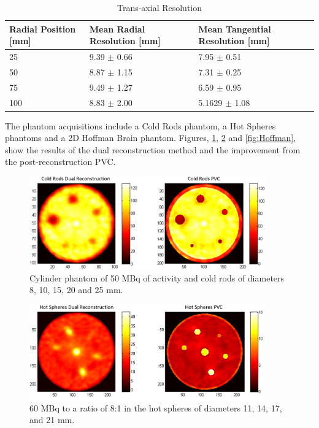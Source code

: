 \begin{table}[!b]
\renewcommand{\arraystretch}{1.3}

\captionsetup{font=small}
\caption{Trans-axial Resolution}
\label{table_reso}
\centering

\begin{tabular}{|p{2.9cm}|p{4.6cm}|p{4.8cm}|}
\hline
Radial Position [mm]& Mean Radial Resolution [mm]& Mean Tangential Resolution [mm] \\
\hline
 25 & 9.39 $\pm$ 0.66 & 7.95 $\pm$ 0.51\\
\hline
 50 & 8.87 $\pm$ 1.15 & 7.31 $\pm$ 0.25\\
\hline
 75 & 9.49 $\pm$ 1.27 & 6.59 $\pm$ 0.95\\
\hline
 100 & 8.83 $\pm$ 2.00 & 5.1629 $\pm$ 1.08\\
\hline
\end{tabular}
\end{table}

 The phantom acquisitions include a Cold Rods phantom, a Hot Spheres phantoms and a 2D Hoffman Brain phantom. Figures, \ref{fig:cold}, \ref{fig:Hot} and \ref{fig:Hoffman}, show the results of the dual reconstruction method and the improvement from the post-reconstruction PVC.

\begin{figure}[!t]
\centering
\includegraphics[width=4in]{figures/ColdRods.png}

\caption{Cylinder phantom of 50 MBq of activity and cold rods of diameters 8, 10, 15, 20 and 25 mm.}
\label{fig:cold}
\end{figure}

\begin{figure}[!t]
\centering
\includegraphics[width=4in]{figures/HotSpheres.png}

\caption{60 MBq to a ratio of 8:1 in the hot spheres of diameters 11, 14, 17, and 21 mm.}
\label{fig:Hot}
\end{figure}

